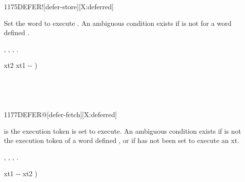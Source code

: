 \begin{worddef}{1175}{DEFER!}[defer-store][X:deferred]
\item {}

	Set the word  to execute .  An ambiguous
	condition exists if  is not for a word defined
	.

\see {},
	,
	,
	.

	\begin{implement} %
		\word{:}   xt2 xt1 -{}- ) \\
		\tab {} \word{!} \word{;}
	\end{implement}

	\begin{testing} %

		 \\

		 \\
	\end{testing}
\end{worddef}


\begin{worddef}{1177}{DEFER@}[defer-fetch][X:deferred]
\item {}

	 is the execution token  is set to execute.
	An ambiguous condition exists if  is not
	the execution token of a word defined
	 ,
	or if  has not been set to execute an xt. 

\see {},
	,
	,
	.

	\begin{implement} %
		\word{:}   xt1 -{}- xt2 ) \\
		\tab {}  \word{;}
	\end{implement}

	\begin{testing} %

		 \\
		 \\

		 \\
		 \\
	\end{testing}
\end{worddef}


